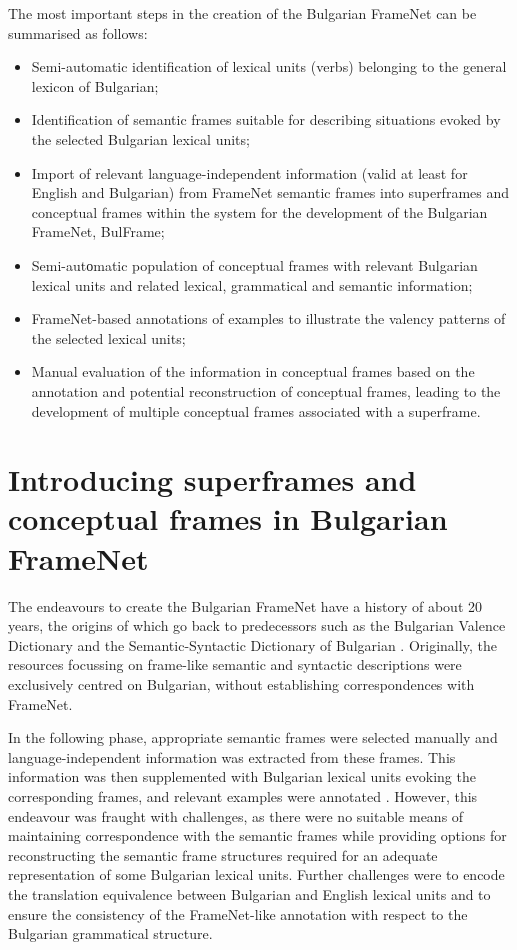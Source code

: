 \documentclass[output=paper,colorlinks,citecolor=brown]{langscibook}
\begin{document}
The most important steps in the creation of the Bulgarian FrameNet can be summarised as follows:
\begin{itemize}
 \item Semi-automatic identification of lexical units (verbs) belonging to the general lexicon of Bulgarian;
 \item Identification of semantic frames suitable for describing situations evoked by the selected Bulgarian lexical units;
 \item Import of relevant language-independent information (valid at least for English and Bulgarian) from FrameNet semantic frames into superframes and conceptual frames within the system for the development of the Bulgarian FrameNet, BulFrame;
 \item Semi-autоmatic population of conceptual frames with relevant Bulgarian lexical units and related lexical, grammatical and semantic information;
 \item FrameNet-based annotations of examples to illustrate the valency patterns of the selected lexical units;
 \item Manual evaluation of the information in conceptual frames based on the annotation and potential reconstruction of conceptual frames, leading to the development of multiple conceptual frames associated with a superframe.
\end{itemize}

\section{Introducing superframes and conceptual frames in Bulgarian FrameNet} 

The endeavours to create the Bulgarian FrameNet have a history of about 20 years, the origins of which go back to predecessors such as the Bulgarian Valence Dictionary and the Semantic-Syntactic Dictionary of Bulgarian \citep{Koevaetal2003}. Originally, the resources focussing on frame-like semantic and syntactic descriptions were exclusively centred on Bulgarian, without establishing correspondences with FrameNet.

In the following phase, appropriate semantic frames were selected manually and language-independent information was extracted from these frames. This information was then supplemented with Bulgarian lexical units evoking the corresponding frames, and relevant examples were annotated \citep{koeva-2010-lexicon}. However, this endeavour was fraught with challenges, as there were no suitable means of maintaining correspondence with the semantic frames while providing options for reconstructing the semantic frame structures required for an adequate representation of some Bulgarian lexical units. Further challenges were to encode the translation equivalence between Bulgarian and English lexical units and to ensure the consistency of the FrameNet-like annotation with respect to the Bulgarian grammatical structure.
\end{document}
